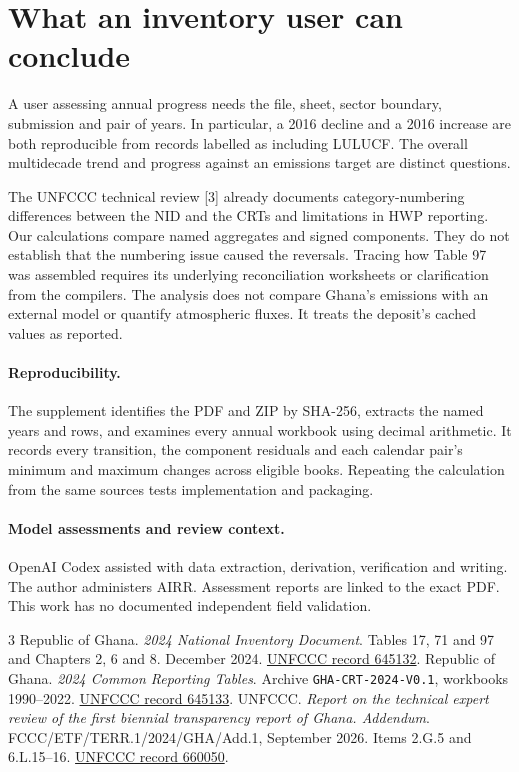 \documentclass[11pt]{article}
\begin{document}
\newpage
\section{What an inventory user can conclude}
A user assessing annual progress needs the file, sheet, sector boundary, submission and pair of years. In particular, a 2016 decline and a 2016 increase are both reproducible from records labelled as including LULUCF. The overall multidecade trend and progress against an emissions target are distinct questions.

The UNFCCC technical review [3] already documents category-numbering differences between the NID and the CRTs and limitations in HWP reporting. Our calculations compare named aggregates and signed components. They do not establish that the numbering issue caused the reversals. Tracing how Table 97 was assembled requires its underlying reconciliation worksheets or clarification from the compilers. The analysis does not compare Ghana's emissions with an external model or quantify atmospheric fluxes. It treats the deposit's cached values as reported.

\paragraph{Reproducibility.} The supplement identifies the PDF and ZIP by SHA-256, extracts the named years and rows, and examines every annual workbook using decimal arithmetic. It records every transition, the component residuals and each calendar pair's minimum and maximum changes across eligible books. Repeating the calculation from the same sources tests implementation and packaging.

\paragraph{Model assessments and review context.} OpenAI Codex assisted with data extraction, derivation, verification and writing. The author administers AIRR. Assessment reports are linked to the exact PDF. This work has no documented independent field validation.

\begin{thebibliography}{3}
 Republic of Ghana. \emph{2024 National Inventory Document}. Tables 17, 71 and 97 and Chapters 2, 6 and 8. December 2024. \href{https://unfccc.int/documents/645132}{UNFCCC record 645132}.
 Republic of Ghana. \emph{2024 Common Reporting Tables}. Archive \texttt{GHA-CRT-2024-V0.1}, workbooks 1990--2022. \href{https://unfccc.int/documents/645133}{UNFCCC record 645133}.
 UNFCCC. \emph{Report on the technical expert review of the first biennial transparency report of Ghana. Addendum}. FCCC/ETF/TERR.1/2024/GHA/Add.1, September 2026. Items 2.G.5 and 6.L.15--16. \href{https://unfccc.int/documents/660050}{UNFCCC record 660050}.
\end{thebibliography}
\end{document}
